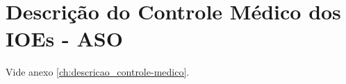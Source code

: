 \chapter{Descrição do Controle Médico dos IOEs - ASO}
Vide anexo \ref{ch:descricao_controle-medico}.